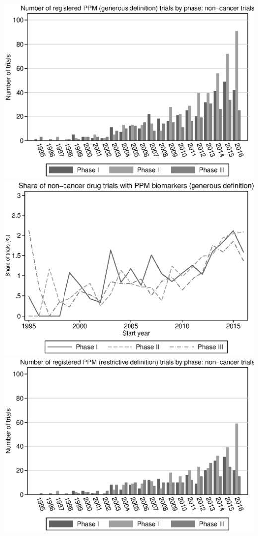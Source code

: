 \includegraphics{../figures/06a-g_ppm_count_by_phase_noncancer.eps}
\includegraphics{../figures/06b-g_ppm_share_by_phase_noncancer.eps}
\includegraphics{../figures/06c-r_ppm_count_by_phase_noncancer.eps}
